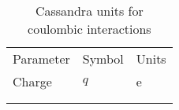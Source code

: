 \begin{center}
\begin{table}[h]
	\begin{center}
	\caption{Cassandra units for coulombic interactions}
	\begin{tabular} {l l l} \\ \hline \hline
	 Parameter & Symbol &  Units \\
	Charge &	 $q$ & e \\ \\ \hline \\
	\end{tabular}
	\end{center}
	\label{Tab:LJ_Units}
\end{table}
\end{center}


